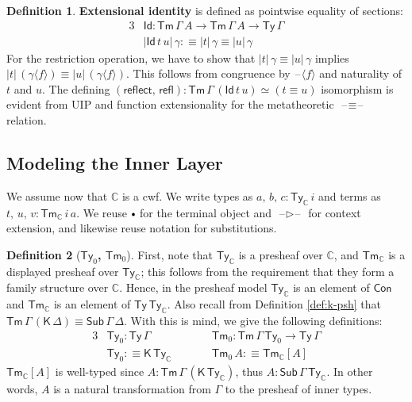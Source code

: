 \documentclass[12pt,a4paper,twoside,openany]{book}
\theoremstyle{remark}
\theoremstyle{definition}
\newtheorem{mydefinition}{Definition}
\theoremstyle{theorem}
\newcommand{\mbb}[1]{\mathbb{#1}}
\newcommand{\refl}{\mathsf{refl}}
\newcommand{\reflect}{\mathsf{reflect}}
\newcommand{\Con}{\mathsf{Con}}
\newcommand{\Sub}{\mathsf{Sub}}
\newcommand{\Tm}{\mathsf{Tm}}
\newcommand{\Ty}{\mathsf{Ty}}
\newcommand{\Id}{\mathsf{Id}}
\newcommand{\blank}{\mathord{\hspace{1pt}\text{--}\hspace{1pt}}}
\newcommand{\ext}{\triangleright}
\newcommand{\emptycon}{\scaleobj{.75}\bullet}
\newcommand{\K}{\mathsf{K}}
\newcommand{\mbbC}{\mbb{C}}
\newcommand{\lab}{\langle}
\newcommand{\rab}{\rangle}
\newcommand{\defn}{:\equiv}
\begin{document}
\begin{mydefinition}
\textbf{Extensional identity} is defined as pointwise equality of sections:
\begin{alignat*}{3}
  & \Id : \Tm\,\Gamma\,A \to \Tm\,\Gamma\,A \to \Ty\,\Gamma\\
  & |\Id\,t\,u|\,\gamma \defn |t|\,\gamma \equiv |u|\,\gamma
\end{alignat*}
For the restriction operation, we have to show that $|t|\,\gamma \equiv
|u|\,\gamma$ implies $|t|\,(\gamma\lab f \rab) \equiv |u|\,(\gamma \lab f
\rab)$. This follows from congruence by $\blank \lab f \rab$ and naturality of
$t$ and $u$.  The defining $(\reflect,\,\refl) : \Tm\,\Gamma\,(\Id\,t\,u) \simeq
(t \equiv u)$ isomorphism is evident from UIP and function extensionality for
the metatheoretic $\blank\!\equiv\!\blank$ relation.
\end{mydefinition}

\subsection{Modeling the Inner Layer}

We assume now that $\mbbC$ is a cwf. We write types as $a,\,b,\,c :
\Ty_\mbbC\,i$ and terms as $t,\,u,\,v : \Tm_\mbbC\,i\,a$. We reuse $\emptycon$
for the terminal object and $\blank\ext\blank$ for context extension, and
likewise reuse notation for substitutions.

\begin{mydefinition}[\textbf{$\Ty_{0}$, $\Tm_{0}$}]
\label{def:psh-ty0-tm0}
First, note that $\Ty_{\mbbC}$ is a presheaf over $\mbbC$, and $\Tm_{\mbbC}$ is
a displayed presheaf over $\Ty_{\mbbC}$; this follows from the requirement that
they form a family structure over $\mbbC$. Hence, in the presheaf model
$\Ty_{\mbbC}$ is an element of $\Con$ and $\Tm_{\mbbC}$ is an element of
$\Ty\,\Ty_{\mbbC}$. Also recall from Definition \ref{def:k-psh} that
$\Tm\,\Gamma\,(\K\,\Delta) \equiv \Sub\,\Gamma\,\Delta$. With this is mind, we
give the following definitions:
\begin{alignat*}{3}
  & \Ty_0 : \Ty\,\Gamma                   && \Tm_0 : \Tm\,\Gamma\,\Ty_0 \to \Ty\,\Gamma\\
  & \Ty_0 \defn \K\,\Ty_{\mbbC}\hspace{2em} && \Tm_0\,A \defn \Tm_{\mbbC}[A]
\end{alignat*}
$\Tm_{\mbbC}[A]$ is well-typed since $A : \Tm\,\Gamma\,(\K\,\Ty_{\mbbC})$, thus
$A : \Sub\,\Gamma\,\Ty_{\mbbC}$. In other words, $A$ is a natural transformation
from $\Gamma$ to the presheaf of inner types.
\end{mydefinition}
\end{document}
